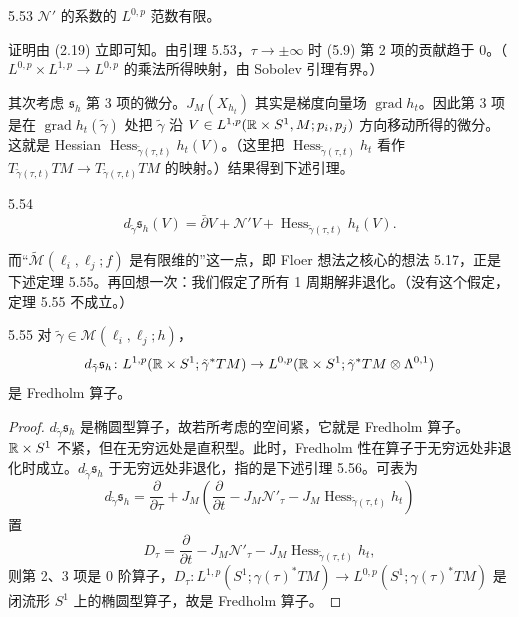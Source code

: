 \begin{lemma}{5.53}
  $\mathcal{N}'$ 的系数的 $L^{0,p}$ 范数有限。
\end{lemma}

证明由 (2.19) 立即可知。由引理 5.53，$\tau\to\pm\infty$ 时 (5.9) 第 2 项的贡献趋于 0。（$L^{0,p}\times L^{1,p}\to L^{0,p}$ 的乘法所得映射，由 Sobolev 引理有界。）

其次考虑 $\mathfrak{s}_h$ 第 3 项的微分。$J_M(X_{h_t})$ 其实是梯度向量场 $\operatorname{grad}h_t$。因此第 3 项是在 $\operatorname{grad}h_t(\tilde\gamma)$ 处把 $\tilde\gamma$ 沿 $V\in L^{1,p}(\mathbb{R}\times S^1,M;p_i,p_j)$ 方向移动所得的微分。这就是 Hessian $\operatorname{Hess}_{\tilde\gamma(\tau,t)}h_t(V)$。（这里把 $\operatorname{Hess}_{\tilde\gamma(\tau,t)}h_t$ 看作 $T_{\tilde\gamma(\tau,t)}TM\to T_{\tilde\gamma(\tau,t)}TM$ 的映射。）结果得到下述引理。

\begin{lemma}{5.54}
  \begin{equation}
    d_{\tilde\gamma}\mathfrak{s}_h(V)
    =\bar\partial V+\mathcal{N}'V+\operatorname{Hess}_{\tilde\gamma(\tau,t)}h_t(V). \tag{5.10}
  \end{equation}
\end{lemma}


而“$\tilde{\mathcal{M}}(\ell_i,\ell_j;f)$ 是有限维的”这一点，即 Floer 想法之核心的想法 5.17，正是下述定理 5.55。再回想一次：我们假定了所有 1 周期解非退化。（没有这个假定，定理 5.55 不成立。）

\begin{theorem*}{5.55}
  对 $\tilde\gamma\in\mathcal{M}(\ell_i,\ell_j;h)$，
  \[
    d_{\tilde\gamma}\mathfrak{s}_h\colon L^{1,p}(\mathbb{R}\times S^1;\tilde\gamma^*TM)
    \to L^{0,p}(\mathbb{R}\times S^1;\tilde\gamma^*TM\otimes\Lambda^{0,1})
  \]
  是 Fredholm 算子。
\end{theorem*}

\begin{proof}
  $d_{\tilde\gamma}\mathfrak{s}_h$ 是椭圆型算子，故若所考虑的空间紧，它就是 Fredholm 算子。$\mathbb{R}\times S^1$ 不紧，但在无穷远处是直积型。此时，Fredholm 性在算子于无穷远处非退化时成立。$d_{\tilde\gamma}\mathfrak{s}_h$ 于无穷远处非退化，指的是下述引理 5.56。可表为
  \[
    d_{\tilde\gamma}\mathfrak{s}_h
    =\frac{\partial}{\partial\tau}
    +J_M\left(\frac{\partial}{\partial t}
      -J_M\mathcal{N}'_\tau-J_M\operatorname{Hess}_{\tilde\gamma(\tau,t)}h_t\right)
  \]
  置
  \[
    D_\tau=\frac{\partial}{\partial t}
    -J_M\mathcal{N}'_\tau-J_M\operatorname{Hess}_{\tilde\gamma(\tau,t)}h_t,
  \]
  则第 2、3 项是 0 阶算子，$D_\tau\colon L^{1,p}(S^1;\gamma(\tau)^*TM)\to L^{0,p}(S^1;\gamma(\tau)^*TM)$
  是闭流形 $S^1$ 上的椭圆型算子，故是 Fredholm 算子。
\end{proof}

